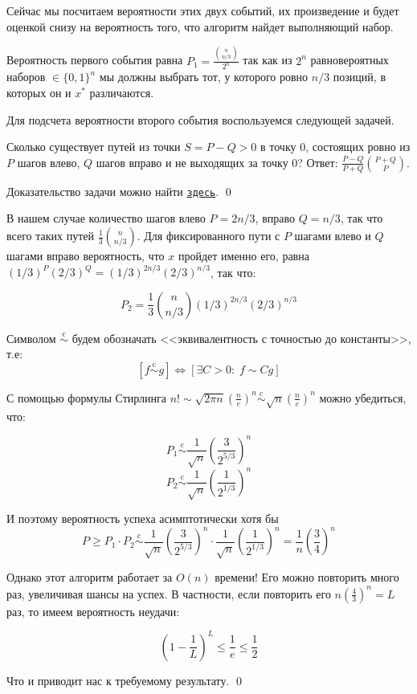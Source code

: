 Сейчас мы посчитаем вероятности этих двух событий, их произведение и будет оценкой снизу на вероятность того, что алгоритм найдет выполняющий набор.

Вероятность первого события равна $P_1 = \frac{{n\choose{n/3}}}{2^n}$ так как из $2^n$ равновероятных наборов $\in \{0, 1\}^n$ мы должны выбрать тот, у которого ровно $n/3$ позиций, в которых он и $x^*$ различаются.

Для подсчета вероятности второго события воспользуемся следующей задачей.

\begin{theorem*}
Сколько существует путей из точки $S=P-Q>0$ в точку $0$, состоящих ровно из $P$ шагов влево, $Q$ шагов вправо и не выходящих за точку 0? Ответ: $\frac{P-Q}{P+Q} {P+Q\choose P}$.
\end{theorem*}
Доказательство задачи можно найти \href{https://drive.google.com/file/d/1KaZ5K6OAp6HiJGrxcBXQsNTa5yug4_FE/view?usp=sharing}{\texttt{здесь}}. \qed

В нашем случае количество шагов влево $P = 2n/3$, вправо $Q=n/3$, так что всего таких путей $\frac{1}{3}{n\choose n/3}$. Для фиксированного пути с $P$ шагами влево и $Q$ шагами вправо вероятность, что $x$ пройдет именно его, равна $(1/3)^P (2/3)^Q = (1/3)^{2n/3} (2/3)^{n/3}$, так что:

$$P_2 = \frac{1}{3} {n\choose n/3} (1/3)^{2n/3} (2/3)^{n/3}$$

\newcommand{\scm}{\overset{\text{c}}{\sim}}
Символом $\scm$ будем обозначать <<эквивалентность с точностью до константы>>, т.е: $$[f \scm g] \iff [\exists C > 0: \; f \sim Cg]$$

С помощью формулы Стирлинга $n! \sim \sqrt{2\pi n}\left(\frac{n}{e}\right)^n \scm \sqrt{n}\left(\frac{n}{e}\right)^n$ можно убедиться, что:

$$ P_1 \scm \frac{1}{\sqrt n}\left(\frac{3}{2^{5/3}}\right)^n$$
$$ P_2 \scm \frac{1}{\sqrt n}\left(\frac{1}{2^{1/3}}\right)^n$$

И поэтому вероятность успеха асимптотически хотя бы
$$P \geq P_1 \cdot P_2 \scm \frac{1}{\sqrt n}\left(\frac{3}{2^{5/3}}\right)^n \cdot \frac{1}{\sqrt n}\left(\frac{1}{2^{1/3}}\right)^n = \frac{1}{n}\left(\frac{3}{4}\right)^n$$

Однако этот алгоритм работает за $O(n)$ времени! Его можно повторить много раз, увеличивая шансы на успех. В частности, если повторить его $n\left(\frac{4}{3}\right)^n = L$ раз, то имеем вероятность неудачи:

$$\left(1-\frac{1}{L}\right)^L \leq \frac{1}{e} \leq \frac{1}{2}$$

Что и приводит нас к требуемому результату. \qed

